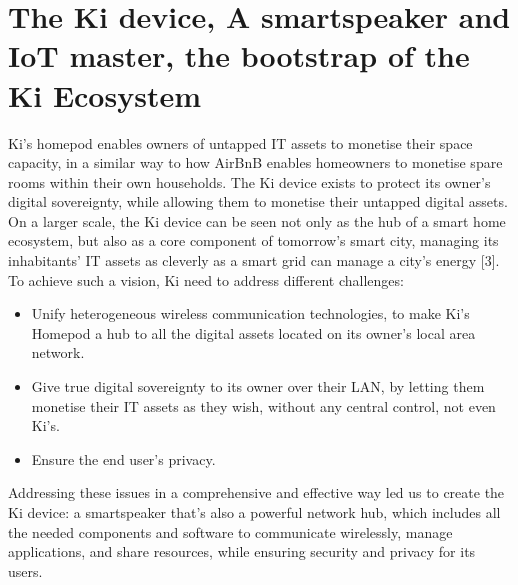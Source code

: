 \section{The Ki device, A smartspeaker and IoT master, the bootstrap of the Ki Ecosystem}
Ki’s homepod enables owners of untapped IT assets to monetise their space capacity, in a similar way to how AirBnB enables homeowners to monetise spare rooms within their own households. The Ki device exists to protect its owner’s digital sovereignty, while allowing them to monetise their untapped digital assets. 
On a larger scale, the Ki device can be seen not only as the hub of a smart home ecosystem, but also as a core component of tomorrow's smart city, managing its inhabitants’ IT assets as cleverly as a smart grid can manage a city’s energy [3].
To achieve such a vision, Ki need to address different challenges:
\begin{itemize}
	\item Unify heterogeneous wireless communication technologies, to make Ki’s Homepod a hub to all the digital assets located on its owner’s local area network.
	\item Give true digital sovereignty to its owner over their LAN, by letting them monetise their IT assets as they wish, without any central control, not even Ki’s.
	\item Ensure the end user’s privacy.
\end{itemize}

Addressing these issues in a comprehensive and effective way led us to create the Ki device: a smartspeaker that’s also a powerful network hub, which includes all the needed components and software to communicate wirelessly, manage applications, and share resources, while ensuring security and privacy for its users. 

